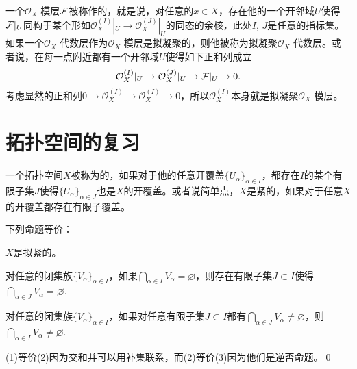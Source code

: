 \para 一个$\mathcal{O}_X$-模层$\mathcal{F}$被称作的，就是说，对任意的$x\in X$，存在他的一个开邻域$U$使得$\mathcal{F}|_U$同构于某个形如$\mathcal{O}_X^{(I)}|_U\to \mathcal{O}_X^{(J)}|_U$的同态的余核，此处$I$, $J$是任意的指标集。如果一个$\mathcal{O}_X$-代数层作为$\mathcal{O}_X$-模层是拟凝聚的，则他被称为拟凝聚$\mathcal{O}_X$-代数层。或者说，在每一点附近都有一个开邻域$U$使得如下正和列成立
\[
	\mathcal{O}_X^{(I)}|_U\to \mathcal{O}_X^{(J)}|_U\to \mathcal{F}|_U\to 0.
\]
考虑显然的正和列$0\to \mathcal{O}_X^{(I)}\to \mathcal{O}_X^{(I)} \to 0$，所以$\mathcal{O}_X^{(I)}$本身就是拟凝聚$\mathcal{O}_X$-模层。


\section{拓扑空间的复习}

\para 一个拓扑空间$X$被称为的，如果对于他的任意开覆盖$\{U_\alpha\}_{\alpha\in I}$，都存在$I$的某个有限子集$J$使得$\{U_\alpha\}_{\alpha\in J}$也是$X$的开覆盖。或者说简单点，$X$是紧的，如果对于任意$X$的开覆盖都存在有限子覆盖。



\pro 下列命题等价：

 $X$是拟紧的。

 对任意的闭集族$\{V_\alpha\}_{\alpha\in I}$，如果$\bigcap_{\alpha\in I} V_\alpha=\varnothing$，则存在有限子集$J\subset I$使得$\bigcap_{\alpha\in J} V_\alpha=\varnothing$.

 对任意的闭集族$\{V_\alpha\}_{\alpha\in I}$，如果对任意有限子集$J\subset I$都有$\bigcap_{\alpha\in J} V_\alpha\neq\varnothing$，则$\bigcap_{\alpha\in I} V_\alpha\neq\varnothing$.

\proof (1)等价(2)因为交和并可以用补集联系，而(2)等价(3)因为他们是逆否命题。\qed

